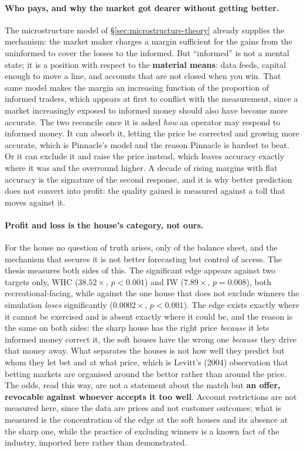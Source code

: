 \documentclass[12pt,a4paper,oneside]{report}
\renewcommand{\_}{\oldunderscore\allowbreak}
\theoremstyle{definition}
\theoremstyle{plain}
\theoremstyle{remark}
\begin{document}
\paragraph{Who pays, and why the market got dearer without getting better.} The microstructure
model of \S\ref{sec:microstructure-theory} already supplies the mechanism: the market maker
charges a margin sufficient for the gains from the uninformed to cover the losses to the
informed. But ``informed'' is not a mental state; it is a position with respect to the
\textbf{material means}: data feeds, capital enough to move a line, and accounts that are not
closed when you win. That same model makes the margin an increasing function of the proportion of
informed traders, which appears at first to conflict with the measurement, since a market
increasingly exposed to informed money should also have become more accurate. The two reconcile
once it is asked \emph{how} an operator may respond to informed money. It can absorb it, letting
the price be corrected and growing more accurate, which is Pinnacle's model and the reason
Pinnacle is hardest to beat. Or it can exclude it and raise the price instead, which leaves
accuracy exactly where it was and the overround higher. A decade of rising margins with flat
accuracy is the signature of the second response, and it is why better prediction does not
convert into profit: the quality gained is measured against a toll that moves against it.

\paragraph{Profit and loss is the house's category, not ours.} For the house no question of
truth arises, only of the balance sheet, and the mechanism that secures it is not better
forecasting but control of access. The thesis measures both sides of this. The significant edge
appears against two targets only, WHC ($38.52\times$, $p<0.001$) and IW ($7.89\times$,
$p=0.008$), both recreational-facing, while against the one house that does not exclude winners
the simulation \emph{loses} significantly ($0.0002\times$, $p<0.001$). The edge exists exactly
where it cannot be exercised and is absent exactly where it could be, and the reason is the same
on both sides: the sharp house has the right price \emph{because} it lets informed money correct
it, the soft houses have the wrong one \emph{because} they drive that money away. What separates
the houses is not how well they predict but whom they let bet and at what price, which is
Levitt's (2004) observation that betting markets are organised around the bettor rather than
around the price. The odds, read this way, are not a statement about the match but \textbf{an
offer, revocable against whoever accepts it too well}. Account restrictions are not measured
here, since the data are prices and not customer outcomes; what is measured is the concentration
of the edge at the soft houses and its absence at the sharp one, while the practice of excluding
winners is a known fact of the industry, imported here rather than demonstrated.
\end{document}
